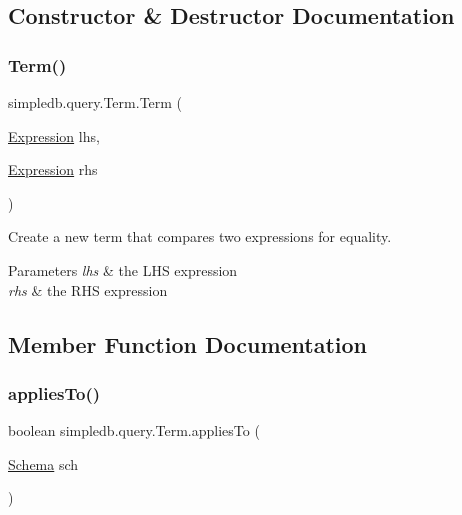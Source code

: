 \subsection{Constructor \& Destructor Documentation}
\mbox{\label{classsimpledb_1_1query_1_1Term_a9e05b76143543f071858b832bd63ecdf}} 
\subsubsection{\texorpdfstring{Term()}{Term()}}
{\footnotesize\ttfamily simpledb.\+query.\+Term.\+Term (\begin{DoxyParamCaption}\item[{\hyperlink{classsimpledb_1_1query_1_1Expression}{Expression}}]{lhs,  }\item[{\hyperlink{classsimpledb_1_1query_1_1Expression}{Expression}}]{rhs }\end{DoxyParamCaption})\hspace{0.3cm}{\ttfamily [inline]}}

Create a new term that compares two expressions for equality. 
\begin{DoxyParams}{Parameters}
{\em lhs} & the L\+HS expression \\
\hline
{\em rhs} & the R\+HS expression \\
\hline
\end{DoxyParams}


\subsection{Member Function Documentation}
\mbox{\label{classsimpledb_1_1query_1_1Term_a9683bc9e3d7e67339ae9c167edc718e3}} 
\subsubsection{\texorpdfstring{applies\+To()}{appliesTo()}}
{\footnotesize\ttfamily boolean simpledb.\+query.\+Term.\+applies\+To (\begin{DoxyParamCaption}\item[{\hyperlink{classsimpledb_1_1record_1_1Schema}{Schema}}]{sch }\end{DoxyParamCaption})\hspace{0.3cm}{\ttfamily [inline]}}

